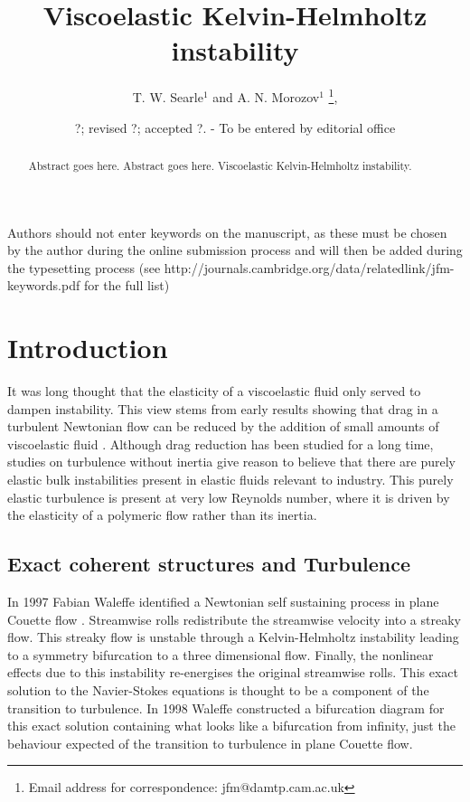 \documentclass{jfm}
\title[Viscoelastic Kelvin-Helmholtz instabilty]{Viscoelastic Kelvin-Helmholtz instability}
\author[T. W. Searle and A. N. Morozov]%
{T. W. Searle$^1$ and A. N. Morozov$^1$%
  \thanks{Email address for correspondence: jfm@damtp.cam.ac.uk},\ns
}
\affiliation{$^1$SUPA, School of Physics and Astronomy, University of Edinburgh, Mayfield Road,
Edinburgh, EH9 3JZ, UK\\[\affilskip]
}
\date{?; revised ?; accepted ?. - To be entered by editorial office}
\begin{document}
\maketitle

\begin{abstract}
  Abstract goes here. Abstract goes here. Viscoelastic Kelvin-Helmholtz instability. 
\end{abstract}

\begin{keywords}
Authors should not enter keywords on the manuscript, as these must be chosen by
the author during the online submission process and will then be added during
the typesetting process (see
http://journals.cambridge.org/data/\linebreak[3]relatedlink/jfm-\linebreak[3]keywords.pdf
for the full list)
\end{keywords}

\section{Introduction}

It was long thought that the elasticity of a viscoelastic fluid only served to
dampen instability. This view stems from early results showing that drag in a
turbulent Newtonian flow can be reduced by the addition of small amounts of
viscoelastic fluid \citep{Toms1977}. Although drag reduction has been studied
for a long time, studies on turbulence without inertia \citep{Larson1990,
Groisman2000} give reason to believe that there are purely elastic bulk
instabilities present in elastic fluids relevant to industry.  This purely
elastic turbulence is present at very low Reynolds number, where it is driven
by the elasticity of a polymeric flow rather than its inertia. 

\subsection{Exact coherent structures and Turbulence}

In 1997 Fabian Waleffe identified a Newtonian self sustaining process in plane
Couette flow \citep{Waleffe1997}. Streamwise rolls redistribute the streamwise
velocity into a streaky flow. This streaky flow is unstable through a
Kelvin-Helmholtz instability leading to a symmetry bifurcation to a three
dimensional flow. Finally, the nonlinear effects due to this instability
re-energises the original streamwise rolls. This exact solution to the
Navier-Stokes equations is thought to be a component of the transition to
turbulence. In 1998 Waleffe constructed a bifurcation diagram for this exact
solution \citep{Waleffe1998} containing what looks like a bifurcation from
infinity, just the behaviour expected of the transition to turbulence in plane
Couette flow.
\end{document}
